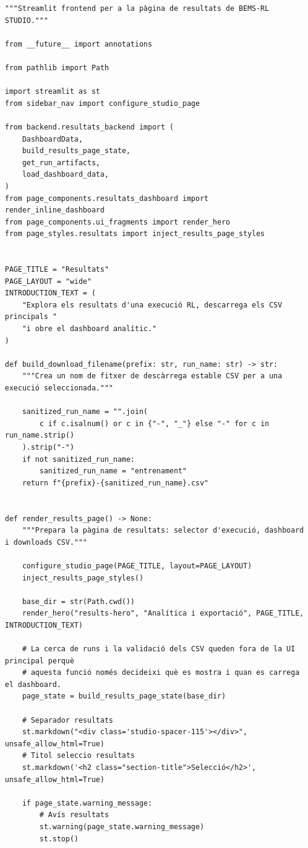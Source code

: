 \documentclass[10pt,a4paper]{article}
\begin{document}
\begin{lstlisting}[style=studioPython,caption={pages/Resultats.py},label={lst:pages-resultats-py}]
"""Streamlit frontend per a la pàgina de resultats de BEMS-RL STUDIO."""

from __future__ import annotations

from pathlib import Path

import streamlit as st
from sidebar_nav import configure_studio_page

from backend.resultats_backend import (
    DashboardData,
    build_results_page_state,
    get_run_artifacts,
    load_dashboard_data,
)
from page_components.resultats_dashboard import render_inline_dashboard
from page_components.ui_fragments import render_hero
from page_styles.resultats import inject_results_page_styles


PAGE_TITLE = "Resultats"
PAGE_LAYOUT = "wide"
INTRODUCTION_TEXT = (
    "Explora els resultats d'una execució RL, descarrega els CSV principals "
    "i obre el dashboard analític."
)

def build_download_filename(prefix: str, run_name: str) -> str:
    """Crea un nom de fitxer de descàrrega estable CSV per a una execució seleccionada."""

    sanitized_run_name = "".join(
        c if c.isalnum() or c in {"-", "_"} else "-" for c in run_name.strip()
    ).strip("-")
    if not sanitized_run_name:
        sanitized_run_name = "entrenament"
    return f"{prefix}-{sanitized_run_name}.csv"


def render_results_page() -> None:
    """Prepara la pàgina de resultats: selector d'execució, dashboard i downloads CSV."""

    configure_studio_page(PAGE_TITLE, layout=PAGE_LAYOUT)
    inject_results_page_styles()

    base_dir = str(Path.cwd())
    render_hero("results-hero", "Analítica i exportació", PAGE_TITLE, INTRODUCTION_TEXT)

    # La cerca de runs i la validació dels CSV queden fora de la UI principal perquè
    # aquesta funció només decideixi què es mostra i quan es carrega el dashboard.
    page_state = build_results_page_state(base_dir)

    # Separador resultats
    st.markdown("<div class='studio-spacer-115'></div>", unsafe_allow_html=True)
    # Titol seleccio resultats
    st.markdown('<h2 class="section-title">Selecció</h2>', unsafe_allow_html=True)

    if page_state.warning_message:
        # Avís resultats
        st.warning(page_state.warning_message)
        st.stop()


\end{lstlisting}
\end{document}
